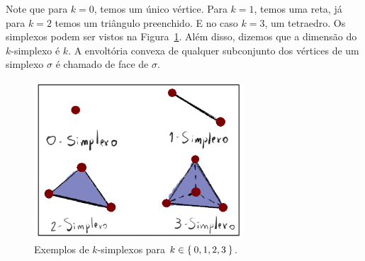 Note que para $k = 0$, temos um único vértice. Para $k=1$, temos uma reta, já
para $k=2$ temos um triângulo preenchido. E no caso $k=3$, um tetraedro. Os
simplexos podem ser vistos na Figura~\ref{fig:ksimpl}. Além disso, dizemos que a dimensão
do $k$-simplexo é $k$. A envoltória convexa de qualquer subconjunto dos vértices
de um simplexo $\sigma$ é chamado de face de $\sigma$.

\begin{figure}[!htpb]
  \centering
  \includegraphics[width=0.7\textwidth]{images/ksimpl.png}
  \caption{Exemplos de $k$-simplexos para $k \in \Set{0,1,2,3}$.}
  \label{fig:ksimpl}
  \fautor
\end{figure}

